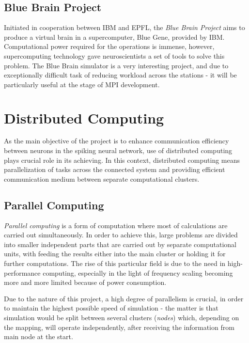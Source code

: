 \subsection{Blue Brain Project}

Initiated in cooperation between IBM and EPFL, the \emph{Blue Brain Project} aims to produce a virtual brain in a supercomputer, Blue Gene, provided by IBM.\cite{BlueBrain} Computational power
required for the operations is immense, however, supercomputing technology gave neuroscientists a set of tools to solve this problem. The Blue Brain simulator is
a very interesting project, and due to exceptionally difficult task of reducing workload across the stations - it will be particularly useful at the stage of MPI development.

\section{Distributed Computing}

As the main objective of the project is to enhance communication efficiency between neurons in the spiking neural network, use of distributed computing plays crucial
role in its achieving. In this context, distributed computing means parallelization of tasks across the connected system and providing efficient communication medium
between separate computational clusters.

\subsection{Parallel Computing}

\emph{Parallel computing} is a form of computation where most of calculations are carried out simultaneously.\cite{G.S.Almasi1989} In order to achieve this, large problems
are divided into smaller independent parts that are carried out by separate computational units, with feeding the results either into the main cluster or holding it for further
computations. The rise of this particular field is due to the need in high-performance computing, especially in the light of frequency scaling becoming more and more
limited because of power consumption.\cite{Kumar2002}

Due to the nature of this project, a high degree of parallelism is crucial, in order to maintain the highest possible speed of simulation - the matter is that simulation would
be split between several clusters (\emph{nodes}) which, depending on the mapping, will operate independently, after receiving the information from main node at the start.

